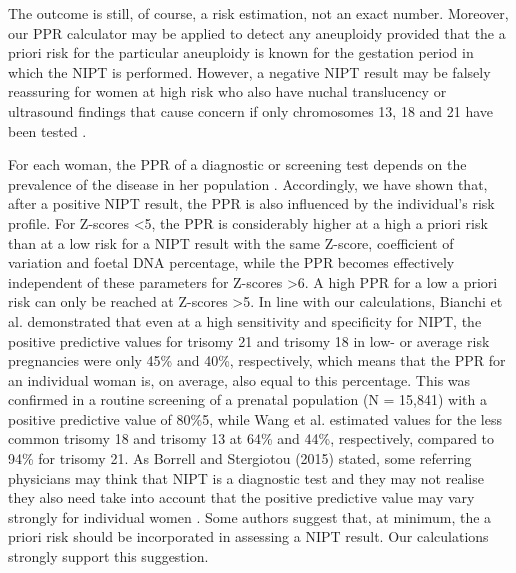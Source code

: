 The outcome is still, of course, a risk estimation, not an exact number. Moreover, our PPR calculator may be applied to detect any aneuploidy provided that the a priori risk for the particular aneuploidy is known for the gestation period in which the NIPT is performed. 
However, a negative NIPT result may be falsely reassuring for women at high risk who also have nuchal translucency or ultrasound findings that cause concern if only chromosomes 13, 18 and 21 have been tested \cite{Smith_2014}.

For each woman, the PPR of a diagnostic or screening test depends on the prevalence of the disease in her population \cite{Lalkhen_2008}. 
Accordingly, we have shown that, after a positive NIPT result, the PPR is also influenced by the individual’s risk profile. 
For Z-scores \textless 5, the PPR is considerably higher at a high a priori risk than at a low risk for a NIPT result with the same Z-score, coefficient of variation and foetal DNA percentage, while the PPR becomes effectively independent of these parameters for Z-scores \textgreater 6. 
A high PPR for a low a priori risk can only be reached at Z-scores \textgreater 5. 
In line with our calculations, Bianchi et al. \cite{Bianchi_2014} demonstrated that even at a high sensitivity and specificity for NIPT, the positive predictive values for trisomy 21 and trisomy 18 in low- or average risk pregnancies were only 45\% and 40\%, respectively, which means that the PPR for an individual woman is, on average, also equal to this percentage. 
This was confirmed in a routine screening of a prenatal population (N = 15,841) with a positive predictive value of 80\%5, while Wang et al. \cite{Wang_2014} estimated values for the less common trisomy 18 and trisomy 13 at 64\% and 44\%, respectively, compared to 94\% for trisomy 21. 
As Borrell and Stergiotou (2015) stated, some referring physicians may think that NIPT is a diagnostic test and they may not realise they also need take into account that the positive predictive value may vary strongly for individual women \cite{Borrell_2015}. 
Some authors \cite{Morain_2013,Sparks_2012a} suggest that, at minimum, the a priori risk should be incorporated in assessing a NIPT result. 
Our calculations strongly support this suggestion.

